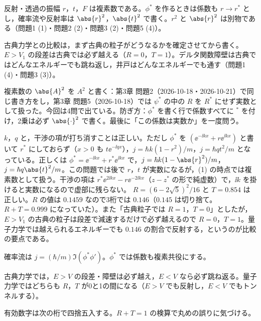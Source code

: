 \begin{daiji}
  \item 反射・透過の振幅 $r$，$t$，$F$ は複素数である。$\phi^{*}$ を作るときは係数も $r\to r^{*}$ とし，確率流や反射率は $\abs{r}^{2}$，$\abs{t}^{2}$ で書く。$r^{2}$ と $\abs{r}^{2}$ は別物である（問題1 (1)・問題2 (2)・問題3 (2)・問題5 (4)）。
  \item 古典力学との比較は，まず古典の粒子がどうなるかを確定させてから書く。$E>V_{1}$ の段差は古典では必ず越える（$R=0$，$T=1$）。デルタ関数障壁は古典ではどんなエネルギーでも跳ね返し，井戸はどんなエネルギーでも通す（問題1 (4)・問題3 (3)）。
\end{daiji}
\begin{maemo}
  \item 複素数の $\abs{A}^{2}$ を $A^{2}$ と書く：第3章 問題2（2026-10-18・2026-10-21）で同じ書き方をし，第3章 問題5（2026-10-18）では $\psi^{*}$ の中の $R$ を $R^{*}$ にせず実数として扱った。今回は4問で出ている。防ぎ方：$\phi^{*}$ を書く行で係数すべてに ${}^{*}$ を付け，2乗は必ず $\abs{\cdot}^{2}$ で書く。最後に「この係数は実数か」を一度問う。
\end{maemo}
\begin{kotaeran}
   $k$，$q$ と，干渉の項が打ち消すことは正しい。ただし $\phi^{*}$ を $(\ee^{-\ii kx}+r\ee^{\ii kx})$ と書いて $r^{*}$ にしておらず（$x>0$ も $t\ee^{-\ii qx}$），$j=\hbar k(1-r^{2})/m$，$j=\hbar q t^{2}/m$ となっている。正しくは $\phi^{*}=\ee^{-\ii kx}+r^{*}\ee^{\ii kx}$ で，$j=\hbar k(1-\abs{r}^{2})/m$，$j=\hbar q\abs{t}^{2}/m$。この問題では後で $r$，$t$ が実数になるが，(1) の時点では複素数として扱う。干渉の項は $r^{*}\ee^{2\ii kx}-r\ee^{-2\ii kx}$（$z-z^{*}$ の形で純虚数）で，$\ii k$ を掛けると実数になるので虚部に残らない。
   $R=(6-2\sqrt{5})^{2}/16$ と $T=\num{0.854}$ は正しい。$R$ の値は $\num{0.1459}$ なので3桁では $\num{0.146}$（$\num{0.145}$ は切り捨て。$R+T=\num{0.999}$ になっていた）。また「古典粒子では $R=1$，$T=0$」としたが，$E>V_{1}$ の古典の粒子は段差で減速するだけで必ず越えるので $R=0$，$T=1$。量子力学では越えられるエネルギーでも $\num{0.146}$ の割合で反射する，というのが比較の要点である。
\end{kotaeran}
\begin{rikai}
  \item 確率流は $j=(\hbar/m)\Im(\phi^{*}\phi')$。$\phi^{*}$ では係数も複素共役にする。
  \item 古典力学では，$E>V$ の段差・障壁は必ず越え，$E<V$ なら必ず跳ね返る。量子力学ではどちらも $R$，$T$ が0と1の間になる（$E>V$ でも反射し，$E<V$ でもトンネルする）。
  \item 有効数字は次の桁で四捨五入する。$R+T=1$ の検算で丸めの誤りに気づける。
\end{rikai}
